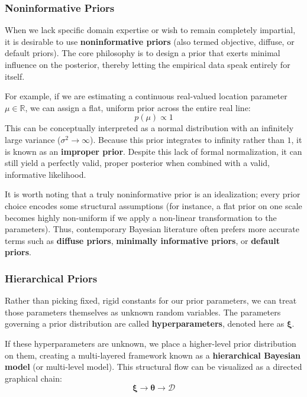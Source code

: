 \documentclass{article}
\begin{document}
\subsubsection{Noninformative Priors}
When we lack specific domain expertise or wish to remain completely impartial, it is desirable to use \textbf{noninformative priors} (also termed objective, diffuse, or default priors). The core philosophy is to design a prior that exerts minimal influence on the posterior, thereby letting the empirical data speak entirely for itself.

For example, if we are estimating a continuous real-valued location parameter $\mu \in \mathbb{R}$, we can assign a flat, uniform prior across the entire real line:
\begin{equation}
p(\mu) \propto 1
\end{equation}
This can be conceptually interpreted as a normal distribution with an infinitely large variance ($\sigma^2 \to \infty$). Because this prior integrates to infinity rather than $1$, it is known as an \textbf{improper prior}. Despite this lack of formal normalization, it can still yield a perfectly valid, proper posterior when combined with a valid, informative likelihood.

It is worth noting that a truly noninformative prior is an idealization; every prior choice encodes some structural assumptions (for instance, a flat prior on one scale becomes highly non-uniform if we apply a non-linear transformation to the parameters). Thus, contemporary Bayesian literature often prefers more accurate terms such as \textbf{diffuse priors}, \textbf{minimally informative priors}, or \textbf{default priors}.

\subsubsection{Hierarchical Priors}
Rather than picking fixed, rigid constants for our prior parameters, we can treat those parameters themselves as unknown random variables. The parameters governing a prior distribution are called \textbf{hyperparameters}, denoted here as $\boldsymbol{\xi}$. 

If these hyperparameters are unknown, we place a higher-level prior distribution on them, creating a multi-layered framework known as a \textbf{hierarchical Bayesian model} (or multi-level model). This structural flow can be visualized as a directed graphical chain:
\begin{equation}
\boldsymbol{\xi} \longrightarrow \boldsymbol{\theta} \longrightarrow \mathcal{D}
\end{equation}
\end{document}
